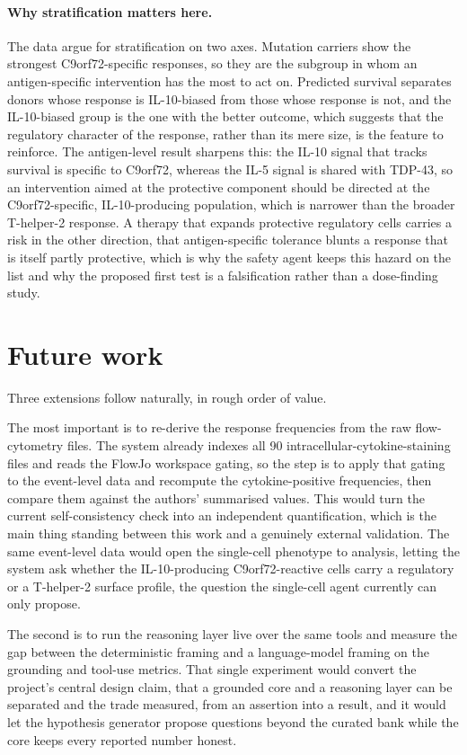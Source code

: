 \documentclass[11pt]{article}
\begin{document}
\paragraph{Why stratification matters here.}
The data argue for stratification on two axes. Mutation carriers show the strongest C9orf72-specific
responses, so they are the subgroup in whom an antigen-specific intervention has the most to act on.
Predicted survival separates donors whose response is IL-10-biased from those whose response is not,
and the IL-10-biased group is the one with the better outcome, which suggests that the regulatory
character of the response, rather than its mere size, is the feature to reinforce. The antigen-level
result sharpens this: the IL-10 signal that tracks survival is specific to C9orf72, whereas the IL-5
signal is shared with TDP-43, so an intervention aimed at the protective component should be directed
at the C9orf72-specific, IL-10-producing population, which is narrower than the broader T-helper-2 response. A
therapy that expands protective regulatory cells carries a risk in the other direction, that
antigen-specific tolerance blunts a response that is itself partly protective, which is why the
safety agent keeps this hazard on the list and why the proposed first test is a falsification rather
than a dose-finding study.

\section{Future work}
Three extensions follow naturally, in rough order of value.

The most important is to re-derive the response frequencies from the raw flow-cytometry files. The
system already indexes all 90 intracellular-cytokine-staining files and reads the FlowJo workspace
gating, so the step is to apply that gating to the event-level data and recompute the cytokine-positive
frequencies, then compare them against the authors' summarised values. This would turn the current
self-consistency check into an independent quantification, which is the main thing standing between
this work and a genuinely external validation. The same event-level data would open the single-cell
phenotype to analysis, letting the system ask whether the IL-10-producing C9orf72-reactive cells carry
a regulatory or a T-helper-2 surface profile, the question the single-cell agent currently can only
propose.

The second is to run the reasoning layer live over the same tools and measure the gap between the
deterministic framing and a language-model framing on the grounding and tool-use metrics. That single
experiment would convert the project's central design claim, that a grounded core and a reasoning
layer can be separated and the trade measured, from an assertion into a result, and it would let the
hypothesis generator propose questions beyond the curated bank while the core keeps every reported
number honest.
\end{document}
